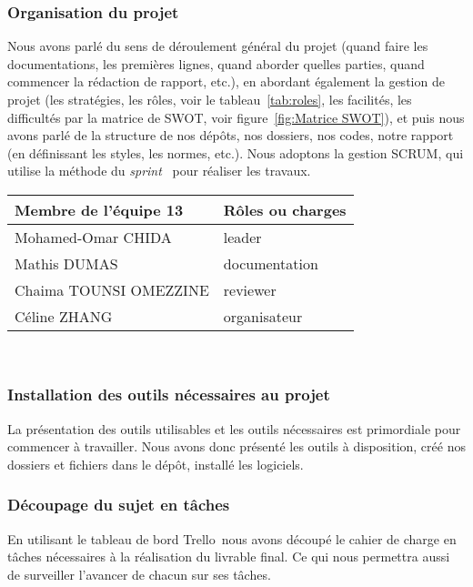 \subsubsection*{Organisation du projet}
Nous avons parlé du sens de déroulement général du projet (quand faire les documentations, les premières lignes, quand aborder quelles parties, quand commencer la rédaction de rapport, etc.), en abordant également la gestion de projet (les stratégies, les rôles, voir le tableau~\ref{tab:roles}, les facilités, les difficultés par la matrice de SWOT, voir figure~\ref{fig:Matrice SWOT}), et puis nous avons parlé de la structure de nos dépôts, nos dossiers, nos codes, notre rapport (en définissant les styles, les normes, etc.). Nous adoptons la gestion SCRUM, qui utilise la méthode du \textsl{sprint} \footnotemark \ pour réaliser les travaux.
    \begin{center}
        \begin{tabular}{|l|l|}
        \hline
            Membre de l'équipe 13 & Rôles ou charges \\
        \hline
        \hline
            Mohamed-Omar CHIDA & leader \\
        \hline
            Mathis DUMAS & documentation \\
        \hline
            Chaima TOUNSI OMEZZINE & reviewer \\
        \hline
            Céline ZHANG & organisateur \\
        \hline
        \end{tabular}\\
    \end{center}



\subsubsection*{Installation des outils nécessaires au projet}
La présentation des outils utilisables et les outils nécessaires est primordiale pour commencer à travailler. Nous avons donc présenté les outils à disposition, créé nos dossiers et fichiers dans le dépôt, installé les logiciels.

\subsubsection*{Découpage du sujet en tâches}
En utilisant le tableau de bord Trello\footnotemark \ nous avons découpé le cahier de charge en tâches nécessaires à la réalisation du livrable final. Ce qui nous permettra aussi de surveiller l'avancer de chacun sur ses tâches.

